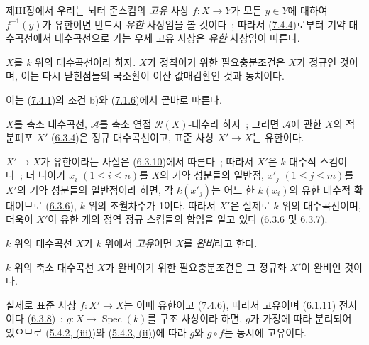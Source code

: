 제III장에서 우리는 뇌터 준스킴의 \emph{고유} 사상 $f:X\to Y$가 모든
$y\in Y$에 대하여 $f^{-1}(y)$가 유한이면 반드시 \emph{유한} 사상임을
볼 것이다~; 따라서 (\hyperref[II.7.4.4-ko]{7.4.4})로부터 기약
대수곡선에서 대수곡선으로 가는 우세 고유 사상은 \emph{유한} 사상임이
따른다.

\begin{corollary}[7.4.5]
\label{II.7.4.5-ko}
$X$를 $k$ 위의 대수곡선이라 하자. $X$가 정칙이기 위한 필요충분조건은
$X$가 정규인 것이며, 이는 다시 닫힌점들의 국소환이 이산 값매김환인 것과
동치이다.
\end{corollary}

이는 (\hyperref[II.7.4.1-ko]{7.4.1})의 조건 b)와
(\hyperref[II.7.1.6-ko]{7.1.6})에서 곧바로 따른다.

\begin{corollary}[7.4.6]
\label{II.7.4.6-ko}
$X$를 축소 대수곡선, $\mathcal{A}$를 축소 연접
$\mathcal{R}(X)$-대수라 하자~; 그러면 $\mathcal{A}$에 관한 $X$의
적분폐포 $X'$ (\hyperref[II.6.3.4-ko]{6.3.4})은 정규 대수곡선이고,
표준 사상 $X'\to X$는 유한이다.
\end{corollary}

$X'\to X$가 유한이라는 사실은 (\hyperref[II.6.3.10-ko]{6.3.10})에서
따른다~; 따라서 $X'$은 $k$-대수적 스킴이다~; 더 나아가 $x_i$
$(1\leq i\leq n)$를 $X$의 기약 성분들의 일반점, $x'_j$
$(1\leq j\leq m)$를 $X'$의 기약 성분들의 일반점이라 하면, 각
$k(x'_j)$는 어느 한 $k(x_i)$의 유한 대수적 확대이므로
(\hyperref[II.6.3.6-ko]{6.3.6}), $k$ 위의 초월차수가 1이다. 따라서
$X'$은 실제로 $k$ 위의 대수곡선이며, 더욱이 $X'$이 유한 개의 정역
정규 스킴들의 합임을 알고 있다
(\hyperref[II.6.3.6-ko]{6.3.6} 및
\hyperref[II.6.3.7-ko]{6.3.7}).

\begin{env}[7.4.7]
\label{II.7.4.7-ko}
$k$ 위의 대수곡선 $X$가 $k$ 위에서 \emph{고유}이면 $X$를
\emph{완비}라고 한다.
\end{env}

\begin{corollary}[7.4.8]
\label{II.7.4.8-ko}
$k$ 위의 축소 대수곡선 $X$가 완비이기 위한 필요충분조건은 그 정규화
$X'$이 완비인 것이다.
\end{corollary}

실제로 표준 사상 $f:X'\to X$는 이때 유한이고
(\hyperref[II.7.4.6-ko]{7.4.6}), 따라서 고유이며
(\hyperref[II.6.1.11-ko]{6.1.11}) 전사이다
(\hyperref[II.6.3.8-ko]{6.3.8})~; $g:X\to\operatorname{Spec}(k)$를
구조 사상이라 하면, $g$가 가정에 따라 분리되어 있으므로
(\hyperref[II.5.4.2-ko]{5.4.2, (iii)})와
(\hyperref[II.5.4.3-ko]{5.4.3, (ii)})에 따라 $g$와 $g\circ f$는
동시에 고유이다.

